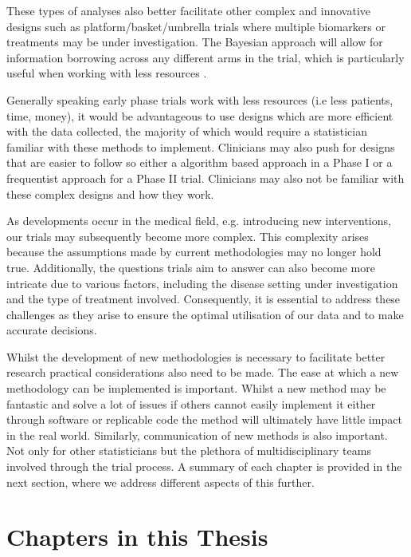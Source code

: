 These types of analyses also better facilitate other complex and innovative designs such as platform/basket/umbrella trials where multiple biomarkers or treatments may be under investigation. The Bayesian approach will allow for information borrowing across any different arms in the trial, which is particularly useful when working with less resources \cite{carlinBayesianComplexInnovative2022}. 

Generally speaking early phase trials work with less resources (i.e less patients, time, money), it would be advantageous to use designs which are more efficient with the data collected, the majority of which would require a statistician familiar with these methods to implement. Clinicians may also push for designs that are easier to follow so either a algorithm based approach in a Phase \RN{1} or a frequentist approach for a Phase \RN{2} trial. Clinicians may also not be familiar with these complex designs and how they work. 

As developments occur in the medical field, e.g. introducing new interventions, our trials may subsequently become more complex.  This complexity arises because the assumptions made by current methodologies may no longer hold true. Additionally, the questions trials aim to answer can also become more intricate due to various factors, including the disease setting under investigation and the type of treatment involved. Consequently, it is essential to address these challenges as they arise to ensure the optimal utilisation of our data and to make accurate decisions. 

Whilst the development of new methodologies is necessary to facilitate better research practical considerations also need to be made. The ease at which a new methodology can be implemented is important. Whilst a new method may be fantastic and solve a lot of issues if others cannot easily implement it either through software or replicable code the method will ultimately have little impact in the real world. Similarly, communication of new methods is also important. Not only for other statisticians but the plethora of multidisciplinary teams involved through the trial process. A summary of each chapter is provided in the next section, where we address different aspects of this further. 
\section{Chapters in this Thesis}

